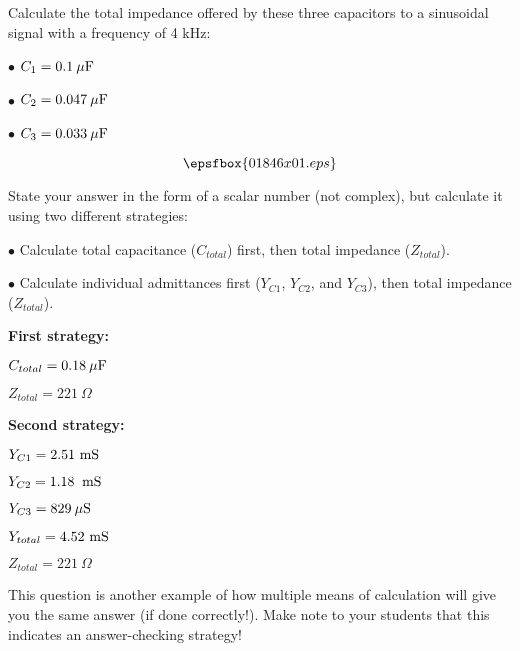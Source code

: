 

Calculate the total impedance offered by these three capacitors to a sinusoidal signal with a frequency of 4 kHz:

\medskip
\item{$\bullet$} $C_1 = 0.1 \> \mu \hbox{F}$
\item{$\bullet$} $C_2 = 0.047 \> \mu \hbox{F}$
\item{$\bullet$} $C_3 = 0.033 \> \mu \hbox{F}$
\medskip

$$\epsfbox{01846x01.eps}$$

State your answer in the form of a scalar number (not complex), but calculate it using two different strategies:

\medskip
\item{$\bullet$} Calculate total capacitance ($C_{total}$) first, then total impedance ($Z_{total}$).
\item{$\bullet$} Calculate individual admittances first ($Y_{C1}$, $Y_{C2}$, and $Y_{C3}$), then total impedance ($Z_{total}$).
\medskip







\noindent
{\bf First strategy:}

$C_{total} = 0.18 \> \mu \hbox{F}$

$Z_{total} = 221 \> \Omega$

\vskip 10pt

\goodbreak

\noindent
{\bf Second strategy:}

$Y_{C1} = 2.51 \hbox{ mS}$

$Y_{C2} = 1.18 \> \hbox{ mS}$

$Y_{C3} = 829 \> \mu \hbox{S}$

$Y_{total} = 4.52 \hbox{ mS}$

$Z_{total} = 221 \> \Omega$







This question is another example of how multiple means of calculation will give you the same answer (if done correctly!).  Make note to your students that this indicates an answer-checking strategy!




